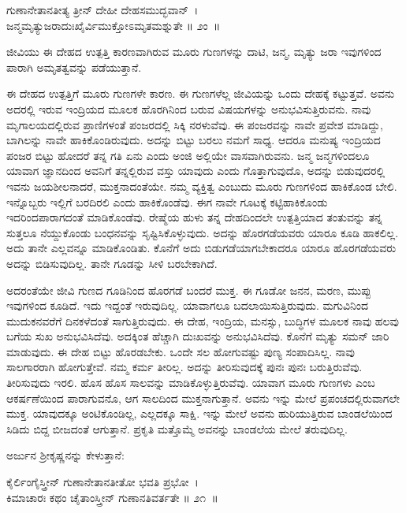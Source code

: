 \begin{shloka}
ಗುಣಾನೇತಾನತೀತ್ಯ ತ್ರೀನ್ ದೇಹೀ ದೇಹಸಮುದ್ಭವಾನ್~।\\ಜನ್ಮಮೃತ್ಯುಜರಾದುಃಖೈರ್ವಿಮುಕ್ತೋಽಮೃತಮಶ್ನುತೇ \hfill॥ ೨ಂ~॥
\end{shloka}

\begin{artha}
ಜೀವಿಯು ಈ ದೇಹದ ಉತ್ಪತ್ತಿ ಕಾರಣವಾಗಿರುವ ಮೂರು ಗುಣಗಳನ್ನು ದಾಟಿ, ಜನ್ಮ, ಮೃತ್ಯು ಜರಾ ಇವುಗಳಿಂದ ಪಾರಾಗಿ ಅಮೃತತ್ವವನ್ನು ಪಡೆಯುತ್ತಾನೆ.
\end{artha}

ಈ ದೇಹದ ಉತ್ಪತ್ತಿಗೆ ಮೂರು ಗುಣಗಳೇ ಕಾರಣ. ಈ ಗುಣಗಳೆಲ್ಲ ಜೀವಿಯನ್ನು ಒಂದು ದೇಹಕ್ಕೆ ಕಟ್ಟುತ್ತವೆ. ಅವನು ಅದರಲ್ಲಿ ಇರುವ ಇಂದ್ರಿಯದ ಮೂಲಕ ಹೊರಗಿನಿಂದ ಬರುವ ವಿಷಯಗಳನ್ನು ಅನುಭವಿಸುತ್ತಿರುವನು. ನಾವು ಮೃಗಾಲಯದಲ್ಲಿರುವ ಪ್ರಾಣಿಗಳಂತೆ ಪಂಜರದಲ್ಲಿ ಸಿಕ್ಕಿ ನರಳುವೆವು. ಈ ಪಂಜರವನ್ನು ನಾವೇ ಪ್ರವೇಶ ಮಾಡಿದ್ದು, ಬಾಗಿಲನ್ನು ನಾವೇ ಹಾಕಿಕೊಂಡಿರುವುದು. ಅದನ್ನು ಬಿಟ್ಟು ಬರಲು ನಮಗೆ ಸಾಧ್ಯ. ಆದರೂ ಮನುಷ್ಯ ಇಂದ್ರಿಯದ ಪಂಜರ ಬಿಟ್ಟು ಹೋದರೆ ತನ್ನ ಗತಿ ಏನು ಎಂದು ಅಂಜಿ ಅಲ್ಲಿಯೇ ವಾಸವಾಗಿರುವನು. ಜನ್ಮ ಜನ್ಮಗಳಿಂದಲೂ ಯಾವಾಗ ಜ್ಞಾನದಿಂದ ಅವನಿಗೆ ತನ್ನಲ್ಲಿರುವ ವಸ್ತು ಯಾವುದು ಎಂದು ಗೊತ್ತಾಗುವುದೊ, ಅದನ್ನು ಬಿಡುವುದರಲ್ಲಿ ಇವನು ಜಯಶೀಲನಾದರೆ, ಮುಕ್ತನಾದಂತೆಯೇ. ನಮ್ಮ ವ್ಯಕ್ತಿತ್ವ ಎಂಬುದು ಮೂರು ಗುಣಗಳಿಂದ ಹಾಕಿಕೊಂಡ ಬೇಲಿ. ಇನ್ನೊಬ್ಬರು ಇಲ್ಲಿಗೆ ಬರದಿರಲಿ ಎಂದು ಹಾಕಿಕೊಂಡೆವು. ಈಗ ನಾವೇ ಗೂಟಕ್ಕೆ ಕಟ್ಟಿಹಾಕಿಕೊಂಡು ಇದರಿಂದ\break ಪಾರಾಗದಂತೆ ಮಾಡಿಕೊಂಡೆವು. ರೇಷ್ಮೆಯ ಹುಳು ತನ್ನ ದೇಹದಿಂದಲೇ ಉತ್ಪತ್ತಿಯಾದ ತಂತುವನ್ನು ತನ್ನ ಸುತ್ತಲೂ ನೆಯ್ದುಕೊಂಡು ಬಂಧನವನ್ನು ಸೃಷ್ಟಿಸಿಕೊಳ್ಳುವುದು. ಅದನ್ನು ಹೊರಗಡೆಯವರು ಯಾರೂ ಕೂಡಿ ಹಾಕಲಿಲ್ಲ. ಅದು ತಾನೇ ಎಲ್ಲವನ್ನೂ ಮಾಡಿಕೊಂಡಿತು. ಕೊನೆಗೆ ಅದು ಬಿಡುಗಡೆಯಾಗಬೇಕಾದರೂ ಯಾರೂ ಹೊರಗಡೆಯವರು ಅದನ್ನು ಬಿಡಿಸುವುದಿಲ್ಲ. ತಾನೇ ಗೂಡನ್ನು ಸೀಳಿ ಬರಬೇಕಾಗಿದೆ.

ಅದರಂತೆಯೇ ಜೀವಿ ಗುಣದ ಗೂಡಿನಿಂದ ಹೊರಗಡೆ ಬಂದರೆ ಮುಕ್ತ. ಈ ಗೂಡೋ ಜನನ, ಮರಣ, ಮುಪ್ಪು ಇವುಗಳಿಂದ ಕೂಡಿದೆ. ಇದು ಇದ್ದಂತೆ ಇರುವುದಿಲ್ಲ. ಯಾವಾಗಲೂ ಬದಲಾಯಿಸುತ್ತಿರುವುದು. ಮಗುವಿನಿಂದ ಮುದುಕನವರೆಗೆ ದಿನಕಳೆದಂತೆ ಸಾಗುತ್ತಿರುವುದು. ಈ ದೇಹ, ಇಂದ್ರಿಯ, ಮನಸ್ಸು, ಬುದ್ಧಿಗಳ ಮೂಲಕ ನಾವು ಹಲವು ಬಗೆಯ ಸುಖ ಅನುಭವಿಸಿದೆವು. ಅದಕ್ಕಿಂತ ಹೆಚ್ಚಾಗಿ ದುಃಖವನ್ನು ಅನುಭವಿಸಿದೆವು. ಕೊನೆಗೆ ಮೃತ್ಯು ಸಮನ್ ಜಾರಿ ಮಾಡುವುದು. ಈ ದೇಹ ಬಿಟ್ಟು ಹೊರಡಬೇಕು. ಒಂದೇ ಸಲ ಹೋಗುವಷ್ಟು ಪುಣ್ಯ ಸಂಪಾದಿಸಿಲ್ಲ. ನಾವು ಸಾಲಗಾರರಾಗಿ ಹೋಗುತ್ತೇವೆ. ನಮ್ಮ ಕರ್ಮ ತೀರಿಲ್ಲ. ಅದನ್ನು ತೀರಿಸುವುದಕ್ಕೆ ಪುನಃ ಪುನಃ ಬರುತ್ತಿರುವೆವು. ತೀರಿಸುವುದು ಇರಲಿ. ಹೊಸ ಹೊಸ ಸಾಲವನ್ನು ಮಾಡಿಕೊಳ್ಳುತ್ತಿರುವೆವು. ಯಾವಾಗ ಮೂರು ಗುಣಗಳು ಎಂಬ ಆಕರ್ಷಣೆಯಿಂದ ಪಾರಾಗುವನೊ, ಆಗ ಸಾಲದಿಂದ ಮುಕ್ತನಾಗುತ್ತಾನೆ. ಅವನು ಇನ್ನು ಮೇಲೆ ಪ್ರಪಂಚದಲ್ಲಿರುವಾಗಲೇ ಮುಕ್ತ. ಯಾವುದಕ್ಕೂ ಅಂಟಿಕೊಂಡಿಲ್ಲ, ಎಲ್ಲದಕ್ಕೂ ಸಾಕ್ಷಿ. ಇನ್ನು ಮೇಲೆ ಅವನು ಹುರಿಯುತ್ತಿರುವ ಬಾಂಡಲೆಯಿಂದ ಸಿಡಿದು ಬಿದ್ದ ಬೀಜದಂತೆ ಆಗುತ್ತಾನೆ. ಪ್ರಕೃತಿ ಮತ್ತೊಮ್ಮೆ ಅವನನ್ನು ಬಾಂಡಲೆಯ ಮೇಲೆ ತರುವುದಿಲ್ಲ.

ಅರ್ಜುನ ಶ‍್ರೀಕೃಷ್ಣನನ್ನು ಕೇಳುತ್ತಾನೆ:

\begin{shloka}
ಕೈರ್ಲಿಂಗೈಸ್ತ್ರೀನ್ ಗುಣಾನೇತಾನತೀತೋ ಭವತಿ ಪ್ರಭೋ~।\\ಕಿಮಾಚಾರಃ ಕಥಂ ಚೈತಾಂಸ್ತ್ರೀನ್ ಗುಣಾನತಿವರ್ತತೇ \hfill॥ ೨೧~॥
\end{shloka}


